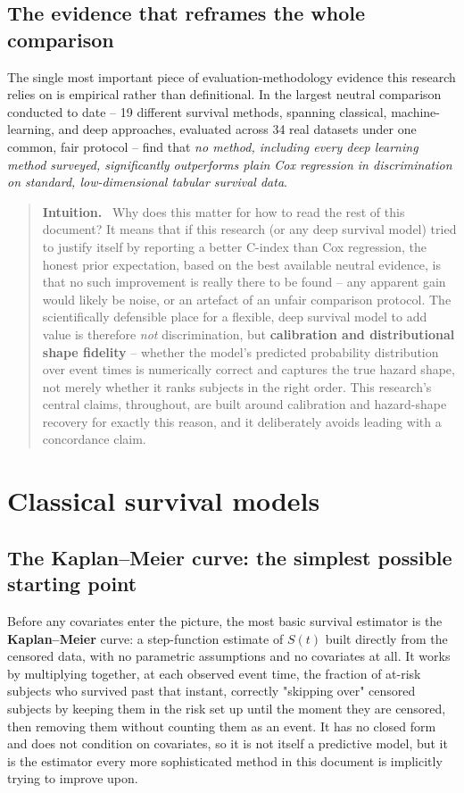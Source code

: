 \documentclass[11pt]{article}
\newenvironment{intuition}
  {\par\addvspace{8pt}\begin{quote}\noindent\textbf{\textcolor{blue!40!black}{Intuition.}}\ }
  {\end{quote}\par\addvspace{8pt}}
\begin{document}
\subsection{The evidence that reframes the whole comparison}

The single most important piece of evaluation-methodology evidence this
research relies on is empirical rather than definitional. In the largest
neutral comparison conducted to date -- 19 different survival methods,
spanning classical, machine-learning, and deep approaches, evaluated
across 34 real datasets under one common, fair protocol --
\citet{burk2024neutral} find that \emph{no method, including every deep
learning method surveyed, significantly outperforms plain Cox regression
in discrimination on standard, low-dimensional tabular survival data}.

\begin{intuition}
Why does this matter for how to read the rest of this document? It means
that if this research (or any deep survival model) tried to justify
itself by reporting a better C-index than Cox regression, the honest
prior expectation, based on the best available neutral evidence, is that
no such improvement is really there to be found -- any apparent gain
would likely be noise, or an artefact of an unfair comparison protocol.
The scientifically defensible place for a flexible, deep survival model
to add value is therefore \emph{not} discrimination, but
\textbf{calibration and distributional shape fidelity} -- whether the
model's predicted probability distribution over event times is
numerically correct and captures the true hazard shape, not merely
whether it ranks subjects in the right order. This research's central
claims, throughout, are built around calibration and hazard-shape
recovery for exactly this reason, and it deliberately avoids leading with
a concordance claim.
\end{intuition}

\section{Classical survival models}
\label{sec:classical}

\subsection{The Kaplan--Meier curve: the simplest possible starting point}

Before any covariates enter the picture, the most basic survival
estimator is the \textbf{Kaplan--Meier} curve: a step-function estimate
of $S(t)$ built directly from the censored data, with no parametric
assumptions and no covariates at all. It works by multiplying together,
at each observed event time, the fraction of at-risk subjects who
survived past that instant, correctly "skipping over" censored subjects
by keeping them in the risk set up until the moment they are censored,
then removing them without counting them as an event. It has no closed
form and does not condition on covariates, so it is not itself a
predictive model, but it is the estimator every more sophisticated method
in this document is implicitly trying to improve upon.
\end{document}
